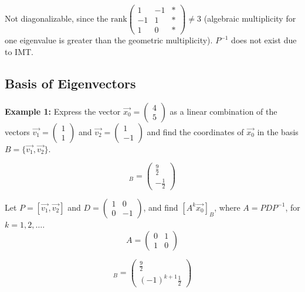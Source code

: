 \noindent
Not diagonalizable, since the \(\text{rank} \begin{pmatrix}
        1 & -1 & * \\
        -1 & 1 & * \\
        1 & 0 & *
    \end{pmatrix} \ne 3\) (algebraic multiplicity for one eigenvalue is greater than the geometric multiplicity). \(P^{-1}\) does not exist due to IMT.

\subsection{Basis of Eigenvectors}
\textbf{Example 1:} Express the vector \(\Vec{x_0}=\begin{pmatrix}
    4 \\ 5
\end{pmatrix}\) as a linear combination of the vectors \(\Vec{v_1}=\begin{pmatrix}
    1 \\ 1
\end{pmatrix}\) and \(\Vec{v_2}= \begin{pmatrix}
    1 \\ -1
\end{pmatrix}\) and find the coordinates of \(\Vec{x_0}\) in the basis \(B=\{\Vec{v_1},\Vec{v_2}\}\).

\begin{equation}
    [\Vec{x_0}]_B = \begin{pmatrix}
        \frac{9}{2} \\ -\frac{1}{2}
    \end{pmatrix}
\end{equation}

\noindent
Let \(P=[\Vec{v_1}, \Vec{v_2}]\) and \(D=\begin{pmatrix}
    1 & 0 \\ 0 & -1
\end{pmatrix}\), and find \([A^k\Vec{x_0}]_B\), where \(A=PDP^{-1}\), for \(k=1,2,\dots\).
\begin{equation}
    A = \begin{pmatrix}
        0 & 1 \\ 1 & 0
    \end{pmatrix}
\end{equation}

\begin{equation}
    [A^k\Vec{x_0}]_B = \begin{pmatrix}
        \frac{9}{2} \\ (-1)^{k+1}\frac{1}{2}
    \end{pmatrix}
\end{equation}

